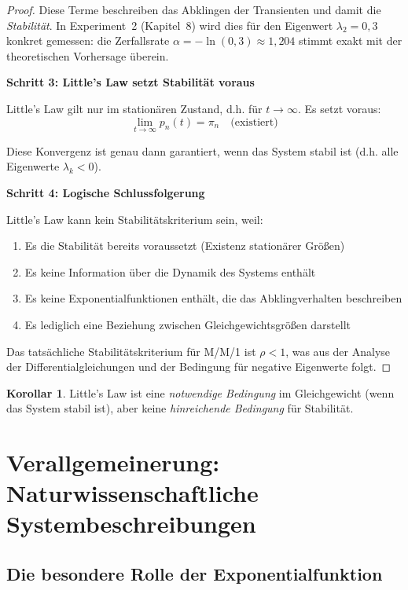 ﻿\documentclass[a4paper,12pt]{report}
\theoremstyle{definition}
\newtheorem{korollar}{Korollar}[section]
\begin{document}
\begin{proof}
	Diese Terme beschreiben das Abklingen der Transienten und damit
	die \textit{Stabilität}.  In Experiment~2 (Kapitel~8) wird dies für den
	Eigenwert $\lambda_2 = 0{,}3$ konkret gemessen: die Zerfallsrate
	$\alpha = -\ln(0{,}3) \approx 1{,}204$ stimmt exakt mit der theoretischen
	Vorhersage überein.
	
	\textbf{Schritt 3: Little's Law setzt Stabilität voraus}
	
	Little's Law gilt nur im stationären Zustand, d.h. für $t \to \infty$. Es setzt voraus:
	\begin{equation}
		\lim_{t \to \infty} p_n(t) = \pi_n \quad \text{(existiert)}
	\end{equation}
	
	Diese Konvergenz ist genau dann garantiert, wenn das System stabil ist (d.h. alle Eigenwerte $\lambda_k < 0$). 
	
	\textbf{Schritt 4: Logische Schlussfolgerung}
	
	Little's Law kann kein Stabilitätskriterium sein, weil:
	\begin{enumerate}
		\item[-] Es die Stabilität bereits voraussetzt (Existenz stationärer Größen)
		\item[-] Es keine Information über die Dynamik des Systems enthält
		\item[-] Es keine Exponentialfunktionen enthält, die das Abklingverhalten beschreiben
		\item[-] Es lediglich eine Beziehung zwischen Gleichgewichtsgrößen darstellt
	\end{enumerate}
	
	Das tatsächliche Stabilitätskriterium für M/M/1 ist $\rho < 1$, was aus der Analyse der Differentialgleichungen und der Bedingung für negative Eigenwerte folgt.
\end{proof}

\begin{korollar}
	Little's Law ist eine \textit{notwendige Bedingung} im Gleichgewicht (wenn das System stabil ist), aber keine \textit{hinreichende Bedingung} für Stabilität.
\end{korollar}

\section{Verallgemeinerung: Naturwissenschaftliche Systembeschreibungen}

\subsection{Die besondere Rolle der Exponentialfunktion}
\end{document}
